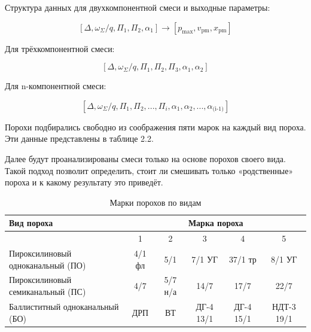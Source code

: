 \documentclass[14pt, a4paper]{extreport} %
\begin{document}
Структура данных для двухкомпонентной смеси и выходные параметры: 

\[
 [\varDelta, \omega_\Sigma / q,  \Pi_1, \Pi_2, \alpha_1] \longrightarrow [p_{\text{max}}, v_{\text{pm}}, x_{\text{pm}}]
\]

Для трёхкомпонентной смеси: 

\[
 [\varDelta, \omega_\Sigma / q,  \Pi_1, \Pi_2,\Pi_3,\alpha_1, \alpha_2] 
\]

Для n-компонентной смеси: 

\[
 [\varDelta, \omega_\Sigma / q,  \Pi_1, \Pi_2,...,\Pi_i, \alpha_1, \alpha_2,...,\alpha_{\text{(i-1)}} ] 
\]

Порохи подбирались свободно из соображения пяти марок на каждый вид пороха. Эти данные представлены в таблице 2.2.  

Далее будут проанализированы смеси только на основе порохов своего вида. Такой подход позволит определить, стоит ли смешивать только «родственные» пороха и к какому результату это приведёт. 

\begin{table}[H]
\centering
\caption{Марки порохов по видам}
\begin{tabular}{|>{\raggedright\arraybackslash}p{}|c|c|c|c|c|}
\hline
\textbf{Вид пороха} & \multicolumn{5}{c|}{\textbf{Марка пороха}} \\
\cline{2-6}
 & 1 & 2 & 3 & 4 & 5 \\
\hline
Пироксилиновый одноканальный (ПО) & 4/1 фл & 5/1 & 7/1 УГ & 37/1 тр & 8/1 УГ \\
\hline
Пироксилиновый семиканальный (ПС) & 4/7 & 5/7 н/а & 14/7 & 17/7 & 22/7 \\
\hline
Баллиститный одноканальный (БО) & ДРП & ВТ & ДГ-4 13/1 & ДГ-4 15/1 & НДТ-3 19/1 \\
\hline
\end{tabular}
\end{table}
\end{document}
